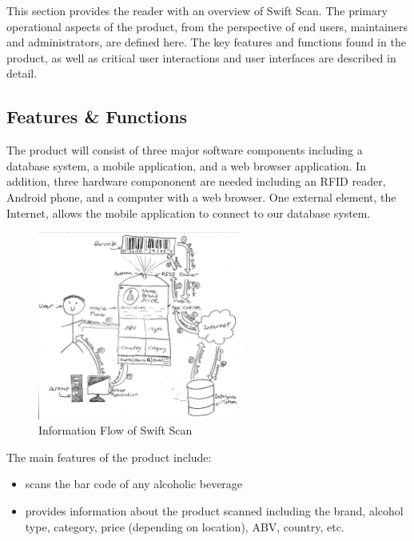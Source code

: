 This section provides the reader with an overview of Swift Scan. The primary operational aspects of the product, from the perspective of end users, maintainers and administrators, are defined here. The key features and functions found in the product, as well as critical user interactions and user interfaces are described in detail.

\subsection{Features \& Functions}
The product will consist of three major software components including a database system, a mobile application, and a web browser application. In addition, three hardware compononent are needed including an RFID reader, Android phone, and a computer with a web browser. One external element, the Internet, allows the mobile application to connect to our database system.

\vspace{0.5 in}
\begin{figure}[h!]
	\centering
   	\includegraphics[width=0.60\textwidth]{images/information_flow.jpg}
   	\caption{Information Flow of Swift Scan}
\end{figure}
\vspace{0.5 in}

The main features of the product include:
\begin{itemize}
    \item scans the bar code of any alcoholic beverage
    \item provides information about the product scanned including the brand, alcohol type, category, price (depending on location), ABV, country, etc.
\end{itemize}


